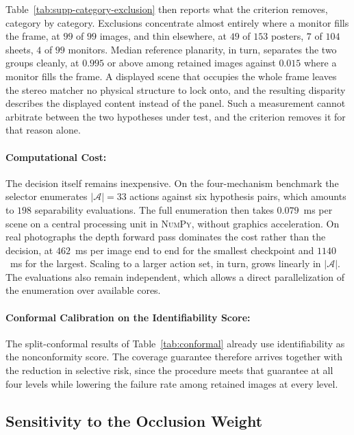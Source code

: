 \documentclass{article} %
\theoremstyle{defstyle}
\theoremstyle{plain}
\begin{document}
Table~\ref{tab:supp-category-exclusion} then reports what the criterion removes, category by
category. Exclusions concentrate almost entirely where a monitor fills the frame, at $99$ of
$99$ images, and thin elsewhere, at $49$ of $153$ posters, $7$ of $104$ sheets, $4$ of $99$
monitors. Median reference planarity, in turn, separates the two groups cleanly, at $0.995$ or
above among retained images against $0.015$ where a monitor fills the frame. A displayed scene
that occupies the whole frame leaves the stereo matcher no physical structure to lock onto, and
the resulting disparity describes the displayed content instead of the panel. Such a
measurement cannot arbitrate between the two hypotheses under test, and the criterion removes
it for that reason alone. \paragraph{Computational Cost:} The decision itself remains
inexpensive. On the four-mechanism benchmark the selector enumerates $|\mathcal{A}| = 33$
actions against six hypothesis pairs, which amounts to $198$ separability evaluations. The full
enumeration then takes $0.079$~ms per scene on a central processing unit in \textsc{NumPy},
without graphics acceleration. On real photographs the depth forward pass dominates the cost
rather than the decision, at $462$~ms per image end to end for the smallest checkpoint and
$1140$~ms for the largest. Scaling to a larger action set, in turn, grows linearly in
$|\mathcal{A}|$. The evaluations also remain independent, which allows a direct parallelization
of the enumeration over available cores.

\paragraph{Conformal Calibration on the Identifiability Score:}
The split-conformal results of Table~\ref{tab:conformal} already use identifiability as the
nonconformity score. The coverage guarantee therefore arrives together with the reduction in
selective risk, since the procedure meets that guarantee at all four levels while lowering the
failure rate among retained images at every level.

\subsection{Sensitivity to the Occlusion Weight}
\label{sec:supp-occlusion}
\end{document}
